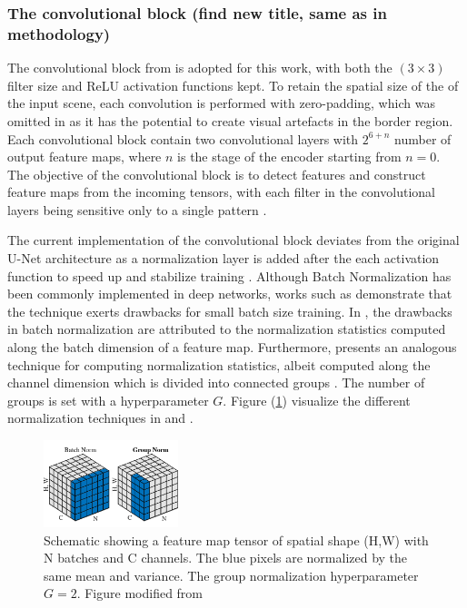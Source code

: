 \documentclass[../main/thesis]{subfiles}
\begin{document}
\subsubsection{The convolutional block (find new title, same as in methodology)}
The convolutional block from \citet{Ronneberger2015} is adopted for this work, with both the $(3 \times 3)$ filter size and ReLU \citep{Nair2010} activation functions kept. To retain the spatial size of the of the input scene, each convolution is performed with zero-padding, which was omitted in \citet{Ronneberger2015} as it has the potential to create visual artefacts in the border region. Each convolutional block contain two convolutional layers with $2^{6 + n}$ number of output feature maps, where $n$ is the stage of the encoder starting from $n = 0$. The objective of the convolutional block is to detect features and construct feature maps from the incoming tensors, with each filter in the convolutional layers being sensitive only to a single pattern \citep{Fukushima1980}.

The current implementation of the convolutional block deviates from the original U-Net architecture as a normalization layer is added after the each activation function to speed up and stabilize training \citep{Ioffe2015}. Although Batch Normalization has been commonly implemented in deep networks, works such as \citet{Wu2018} demonstrate that the technique exerts drawbacks for small batch size training. In \citet{Wu2018}, the drawbacks in batch normalization are attributed to the normalization statistics computed along the batch dimension of a feature map. Furthermore, \citet{Wu2018} presents an analogous technique for computing normalization statistics, albeit computed along the channel dimension which is divided into connected groups \citep{Wu2018}. The number of groups is set with a hyperparameter $G$. Figure (\ref{fig:BNGN}) visualize the different normalization techniques in \citet{Ioffe2015} and \citet{Wu2018}.

\begin{figure}
    \centering
    \includegraphics[width=0.35\textwidth]{BNandGN.png}
    \caption{\label{fig:BNGN}Schematic showing a feature map tensor of spatial shape (H,W) with N batches and C channels. The blue pixels are normalized by the same mean and variance. The group normalization hyperparameter $G = 2$. Figure modified from \protect\citep{Wu2018}}
\end{figure}
\end{document}
